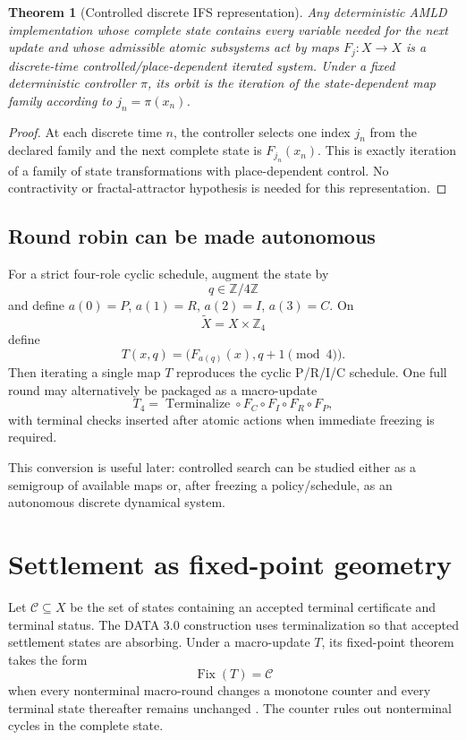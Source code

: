 \documentclass[11pt]{article}
\newtheorem{theorem}{Theorem}[section]
\theoremstyle{definition}
\theoremstyle{remark}
\newcommand{\Cset}{\mathcal C}
\newcommand{\Fix}{\operatorname{Fix}}
\begin{document}
\begin{theorem}[Controlled discrete IFS representation]\label{thm:ifs}
Any deterministic AMLD implementation whose complete state contains every variable needed for the next update and whose admissible atomic subsystems act by maps $F_j:X\to X$ is a discrete-time controlled/place-dependent iterated system. Under a fixed deterministic controller $\pi$, its orbit is the iteration of the state-dependent map family according to $j_n=\pi(x_n)$.
\end{theorem}

\begin{proof}
At each discrete time $n$, the controller selects one index $j_n$ from the declared family and the next complete state is $F_{j_n}(x_n)$. This is exactly iteration of a family of state transformations with place-dependent control. No contractivity or fractal-attractor hypothesis is needed for this representation.
\end{proof}

\subsection{Round robin can be made autonomous}
For a strict four-role cyclic schedule, augment the state by
\[
q\in\mathbb Z/4\mathbb Z
\]
and define $a(0)=P$, $a(1)=R$, $a(2)=I$, $a(3)=C$. On
\[
\widetilde X=X\times\mathbb Z_4
\]
define
\[
T(x,q)=\bigl(F_{a(q)}(x),q+1\pmod4\bigr).
\]
Then iterating a single map $T$ reproduces the cyclic P/R/I/C schedule. One full round may alternatively be packaged as a macro-update
\[
T_4=\operatorname{Terminalize}\circ F_C\circ F_I\circ F_R\circ F_P,
\]
with terminal checks inserted after atomic actions when immediate freezing is required.

This conversion is useful later: controlled search can be studied either as a semigroup of available maps or, after freezing a policy/schedule, as an autonomous discrete dynamical system.

\section{Settlement as fixed-point geometry}

Let $\Cset\subseteq X$ be the set of states containing an accepted terminal certificate and terminal status. The DATA 3.0 construction uses terminalization so that accepted settlement states are absorbing. Under a macro-update $T$, its fixed-point theorem takes the form
\[
\Fix(T)=\Cset
\]
when every nonterminal macro-round changes a monotone counter and every terminal state thereafter remains unchanged \cite{Data3}. The counter rules out nonterminal cycles in the complete state.
\end{document}
